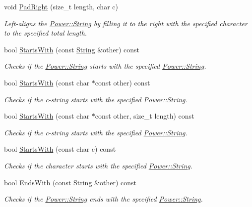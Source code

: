 \begin{DoxyCompactItemize}
void \hyperlink{class_power_1_1_string_ae8f53778737d45ccf92e466fb5d179de}{Pad\+Right} (size\+\_\+t length, char c)
\begin{DoxyCompactList}\small\item\em Left-\/aligns the \hyperlink{class_power_1_1_string}{Power\+::\+String} by filling it to the right with the specified character to the specified total length. \end{DoxyCompactList}\item 
bool \hyperlink{class_power_1_1_string_ab4836da082c63ddf9f781eb80a10e5d1}{Starts\+With} (const \hyperlink{class_power_1_1_string}{String} \&other) const
\begin{DoxyCompactList}\small\item\em Checks if the \hyperlink{class_power_1_1_string}{Power\+::\+String} starts with the specified \hyperlink{class_power_1_1_string}{Power\+::\+String}. \end{DoxyCompactList}\item 
bool \hyperlink{class_power_1_1_string_a97d52a90799b590cfed6f3ce9d2204fc}{Starts\+With} (const char $\ast$const other) const
\begin{DoxyCompactList}\small\item\em Checks if the c-\/string starts with the specified \hyperlink{class_power_1_1_string}{Power\+::\+String}. \end{DoxyCompactList}\item 
bool \hyperlink{class_power_1_1_string_a5f0999383b26616b84abe75a4ea8a185}{Starts\+With} (const char $\ast$const other, size\+\_\+t length) const
\begin{DoxyCompactList}\small\item\em Checks if the c-\/string starts with the specified \hyperlink{class_power_1_1_string}{Power\+::\+String}. \end{DoxyCompactList}\item 
bool \hyperlink{class_power_1_1_string_a7c32b540950bc8b7061751333ec8ef17}{Starts\+With} (const char c) const
\begin{DoxyCompactList}\small\item\em Checks if the character starts with the specified \hyperlink{class_power_1_1_string}{Power\+::\+String}. \end{DoxyCompactList}\item 
bool \hyperlink{class_power_1_1_string_ae936d98f4be00ce5b901a561cac63ab0}{Ends\+With} (const \hyperlink{class_power_1_1_string}{String} \&other) const
\begin{DoxyCompactList}\small\item\em Checks if the \hyperlink{class_power_1_1_string}{Power\+::\+String} ends with the specified \hyperlink{class_power_1_1_string}{Power\+::\+String}. \end{DoxyCompactList}\item 

\end{DoxyCompactItemize}
